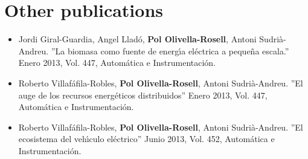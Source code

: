 \documentclass[a4paper,11pt,twoside,openright]{report}
\begin{document}
\section{Other publications}

\begin{itemize}
\item Jordi Giral-Guardia, Angel Llad\'{o}, \textbf{Pol Olivella-Rosell}, Antoni Sudri\`{a}-Andreu.
''La biomasa como fuente de energ\'{\i}a el\'{e}ctrica a peque\~{n}a escala.'' Enero 2013, Vol. 447, Autom\'{a}tica e Instrumentaci\'{o}n.
\item Roberto Villaf\'{a}fila-Robles,\textbf{ Pol Olivella-Rosell}, Antoni Sudri\`{a}-Andreu.
''El auge de los recursos energ\'{e}ticos distribuidos'' Enero 2013, Vol. 447, Autom\'{a}tica e Instrumentaci\'{o}n.
\item Roberto Villaf\'{a}fila-Robles, \textbf{Pol Olivella-Rosell}, Antoni Sudri\`{a}-Andreu.
''El ecosistema del veh\'{\i}culo el\'{e}ctrico'' Junio 2013, Vol. 452, Autom\'{a}tica e Instrumentaci\'{o}n.
\end{itemize}

	
	
\end{document}
